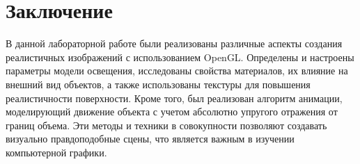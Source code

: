 \documentclass[a4paper, 14pt]{extarticle}
\begin{document}
\section{Заключение}
\par
В данной лабораторной работе были реализованы различные аспекты создания реалистичных изображений с использованием OpenGL. Определены и настроены параметры модели освещения, исследованы свойства материалов, их влияние на внешний вид объектов, а также использованы текстуры для повышения реалистичности поверхности. Кроме того, был реализован алгоритм анимации, моделирующий движение объекта с учетом абсолютно упругого отражения от границ объема. Эти методы и техники в совокупности позволяют создавать визуально правдоподобные сцены, что является важным в изучении компьютерной графики.
\end{document}
